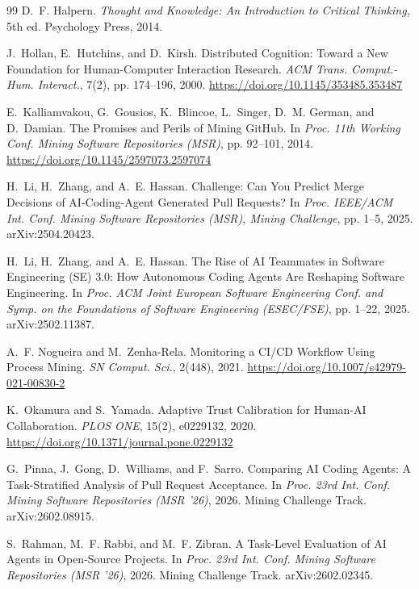 \documentclass[sigconf]{acmart}
\begin{document}
\begin{thebibliography}{99}
D.~F. Halpern.
\newblock \emph{Thought and Knowledge: An Introduction to Critical Thinking}, 5th ed.
\newblock Psychology Press, 2014.

J.~Hollan, E.~Hutchins, and D.~Kirsh.
\newblock Distributed Cognition: Toward a New Foundation for Human-Computer Interaction Research.
\newblock \emph{ACM Trans. Comput.-Hum. Interact.}, 7(2), pp. 174--196, 2000. \url{https://doi.org/10.1145/353485.353487}

E.~Kalliamvakou, G.~Gousios, K.~Blincoe, L.~Singer, D.~M. German, and D.~Damian.
\newblock The Promises and Perils of Mining {GitHub}.
\newblock In \emph{Proc. 11th Working Conf. Mining Software Repositories (MSR)}, pp. 92--101, 2014.
\newblock \url{https://doi.org/10.1145/2597073.2597074}

H.~Li, H.~Zhang, and A.~E. Hassan.
 Challenge: Can You Predict Merge Decisions of {AI}-Coding-Agent Generated Pull Requests?
\newblock In \emph{Proc. IEEE/ACM Int. Conf. Mining Software Repositories (MSR), Mining Challenge}, pp. 1--5, 2025. arXiv:2504.20423.

H.~Li, H.~Zhang, and A.~E. Hassan.
\newblock The Rise of {AI} Teammates in Software Engineering ({SE}) 3.0: How Autonomous Coding Agents Are Reshaping Software Engineering.
\newblock In \emph{Proc. ACM Joint European Software Engineering Conf. and Symp. on the Foundations of Software Engineering (ESEC/FSE)}, pp. 1--22, 2025. arXiv:2502.11387.

A.~F. Nogueira and M.~Zenha-Rela.
\newblock Monitoring a {CI/CD} Workflow Using Process Mining.
\newblock \emph{SN Comput. Sci.}, 2(448), 2021. \url{https://doi.org/10.1007/s42979-021-00830-2}

K.~Okamura and S.~Yamada.
\newblock Adaptive Trust Calibration for Human-AI Collaboration.
\newblock \emph{PLOS ONE}, 15(2), e0229132, 2020. \url{https://doi.org/10.1371/journal.pone.0229132}

G.~Pinna, J.~Gong, D.~Williams, and F.~Sarro.
\newblock Comparing {AI} Coding Agents: A Task-Stratified Analysis of Pull Request Acceptance.
\newblock In \emph{Proc. 23rd Int. Conf. Mining Software Repositories (MSR '26)}, 2026. Mining Challenge Track. arXiv:2602.08915.

S.~Rahman, M.~F. Rabbi, and M.~F. Zibran.
\newblock A Task-Level Evaluation of {AI} Agents in Open-Source Projects.
\newblock In \emph{Proc. 23rd Int. Conf. Mining Software Repositories (MSR '26)}, 2026. Mining Challenge Track. arXiv:2602.02345.


\end{thebibliography}
\end{document}
